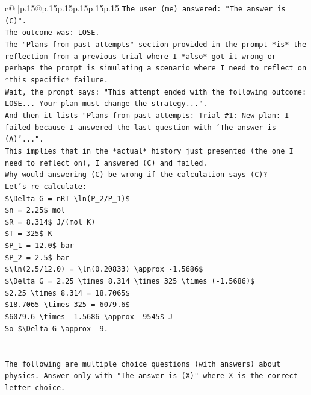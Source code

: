 \documentclass{article}
\begin{document}
{\begin{supertabular}{c@{$\;$}|p{.15\linewidth}@{}p{.15\linewidth}p{.15\linewidth}p{.15\linewidth}p{.15\linewidth}p{.15\linewidth}}
{{{\texttt{The user (me) answered: "The answer is (C)".} \\
\texttt{The outcome was: LOSE.} \\
\texttt{The "Plans from past attempts" section provided in the prompt *is* the reflection from a previous trial where I *also* got it wrong or perhaps the prompt is simulating a scenario where I need to reflect on *this specific* failure.} \\
\texttt{Wait, the prompt says: "This attempt ended with the following outcome: LOSE... Your plan must change the strategy...".} \\
\texttt{And then it lists "Plans from past attempts: Trial \#1: New plan: I failed because I answered the last question with 'The answer is (A)'...".} \\
\texttt{This implies that in the *actual* history just presented (the one I need to reflect on), I answered (C) and failed.} \\
\texttt{Why would answering (C) be wrong if the calculation says (C)?} \\
\texttt{Let's re{-}calculate:} \\
\texttt{\$\textbackslash{}Delta G = nRT \textbackslash{}ln(P\_2/P\_1)\$} \\
\texttt{\$n = 2.25\$ mol} \\
\texttt{\$R = 8.314\$ J/(mol K)} \\
\texttt{\$T = 325\$ K} \\
\texttt{\$P\_1 = 12.0\$ bar} \\
\texttt{\$P\_2 = 2.5\$ bar} \\
\texttt{\$\textbackslash{}ln(2.5/12.0) = \textbackslash{}ln(0.20833) \textbackslash{}approx {-}1.5686\$} \\
\texttt{\$\textbackslash{}Delta G = 2.25 \textbackslash{}times 8.314 \textbackslash{}times 325 \textbackslash{}times ({-}1.5686)\$} \\
\texttt{\$2.25 \textbackslash{}times 8.314 = 18.7065\$} \\
\texttt{\$18.7065 \textbackslash{}times 325 = 6079.6\$} \\
\texttt{\$6079.6 \textbackslash{}times {-}1.5686 \textbackslash{}approx {-}9545\$ J} \\
\texttt{So \$\textbackslash{}Delta G \textbackslash{}approx {-}9.} \\
\\ 
\\ 
\texttt{The following are multiple choice questions (with answers) about physics. Answer only with "The answer is (X)" where X is the correct letter choice.} \\
}}}
\end{supertabular}}
\end{document}
